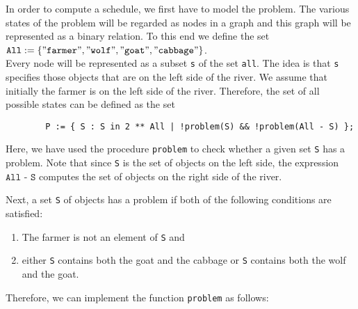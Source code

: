 \noindent
In order to compute a schedule, we first have to model the problem.  The various states of the problem will
be regarded as nodes in a graph and this graph will be represented as a binary relation.
To this end we define the set
\\[0.2cm]
\hspace*{1.3cm} 
$\texttt{All} := \{ \squote{farmer}, \squote{wolf}, \squote{goat},\squote{cabbage} \}$.
\\[0.2cm]
Every node will be represented as a subset \texttt{s} of the set \texttt{all}.  The idea is that \texttt{s}
specifies those objects that are on the left side of the river.  We assume that initially the farmer
is on the left side of the river. 
Therefore, the set of all possible states can be defined as the set
\begin{verbatim}
        P := { S : S in 2 ** All | !problem(S) && !problem(All - S) };
\end{verbatim}
Here, we have used the procedure \texttt{problem} to check whether a given set \texttt{S} has a problem. 
Note that since \texttt{S} is the set of objects on the left side, the expression $\texttt{All - S}$
computes the set of objects on the right side of the river.

Next, a set \texttt{S} of objects has a problem if both of the following conditions
are satisfied:
\begin{enumerate}
\item The farmer is not an element of \texttt{S} and
\item either \texttt{S} contains both the goat and the cabbage or \texttt{S} contains both the wolf and the goat.
\end{enumerate}
Therefore, we can implement the function \texttt{problem} as follows:
\pagebreak

